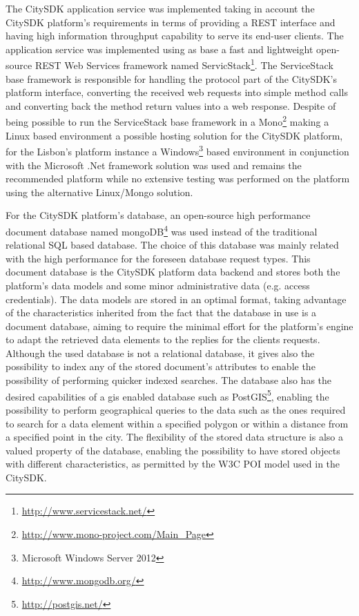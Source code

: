 \documentclass[times]{ettauth}
\begin{document}
The CitySDK application service was implemented taking in account the CitySDK platform's requirements in terms of providing a REST interface and having high information throughput capability to serve its end-user clients. 
The application service was implemented using as base a fast and lightweight open-source REST Web Services framework named ServicStack\footnote{\url{http://www.servicestack.net/}}. The ServiceStack base framework is responsible for handling the protocol part of the CitySDK's platform interface, converting the received web requests into simple method calls and converting back the method return values into a web response. 
Despite of being possible to run the ServiceStack base framework in a Mono\footnote{\url{http://www.mono-project.com/Main_Page}} making a Linux based environment a possible hosting solution for the CitySDK platform, for the Lisbon's platform instance a Windows\footnote{Microsoft Windows Server 2012} based environment in conjunction with the Microsoft .Net framework solution was used and remains the recommended platform while no extensive testing was performed on the platform using the alternative Linux/Mongo solution.

For the CitySDK platform's database, an open-source high performance document database named mongoDB\footnote{\url{http://www.mongodb.org/}} was used instead of the traditional relational SQL based database. 
The choice of this database was mainly related with the high performance for the foreseen database request types. 
This document database is the CitySDK platform data backend and stores both the platform's data models and some minor administrative data (e.g. access credentials). 
The data models are stored in an optimal format, taking advantage of the characteristics inherited from the fact that the database in use is a document database, aiming to require the minimal effort for the platform's engine to adapt the retrieved data elements to the replies for the clients requests. 
Although the used database is not a relational database, it gives also the possibility to index any of the stored document's attributes to enable the possibility of performing quicker indexed searches. 
The database also has the desired capabilities of a \ac{gis} enabled database such as PostGIS\footnote{\url{http://postgis.net/}}, enabling the possibility to perform geographical queries to the data such as the ones required to search for a data element within a specified polygon or within a distance from a specified point in the city. 
The flexibility of the stored data structure is also a valued property of the database, enabling the possibility to have stored objects with different characteristics, as permitted by the W3C POI model used in the CitySDK.
\end{document}
